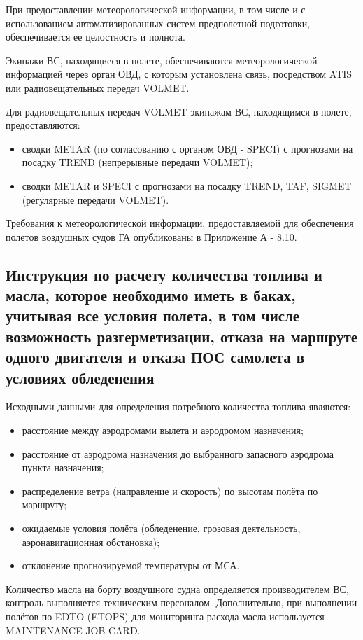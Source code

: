 При предоставлении метеорологической информации, в том числе и с использованием автоматизированных систем предполетной подготовки, обеспечивается ее целостность и полнота. 

Экипажи ВС, находящиеся в полете, обеспечиваются метеорологической информацией через орган ОВД, с которым установлена связь, посредством ATIS или радиовещательных передач VOLMET. 

Для радиовещательных передач VOLMET экипажам ВС, находящимся в полете, предоставляются: 
\begin{itemize}
    \item сводки METAR (по согласованию с органом ОВД - SPECI) с прогнозами на посадку TREND (непрерывные передачи VOLMET);
    \item сводки METAR и SPECI с прогнозами на посадку TREND, TAF, SIGMET (регулярные передачи VOLMET).
\end{itemize}

Требования к метеорологической информации, предоставляемой для обеспечения полетов воздушных судов ГА опубликованы в Приложение А - 8.10.


\subsection{Инструкция по расчету количества топлива и масла, которое необходимо иметь в баках, учитывая все условия полета, в том числе возможность разгерметизации, отказа на маршруте одного двигателя и отказа ПОС самолета в условиях обледенения} \label{par:849}

Исходными данными для определения потребного количества топлива являются: 
\begin{itemize}
    \item расстояние между аэродромами вылета и аэродромом назначения;
    \item расстояние от аэродрома назначения до выбранного запасного аэродрома пункта назначения;
    \item распределение ветра (направление и скорость) по высотам полёта по маршруту;
    \item ожидаемые условия полёта (обледенение, грозовая деятельность, аэронавигационная обстановка); 
    \item отклонение прогнозируемой температуры от МСА.
\end{itemize}
	 
Количество масла на борту воздушного судна определяется производителем ВС, контроль выполняется техническим персоналом. Дополнительно, при выполнении полётов по EDTO (ETOPS) для мониторинга расхода масла используется MAINTENANCE JOB CARD.

